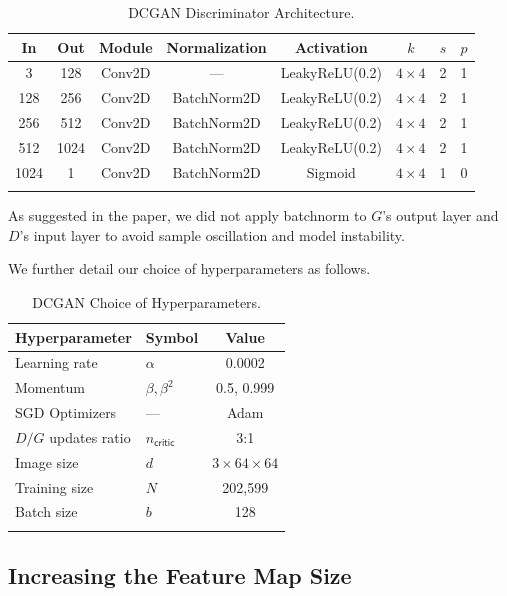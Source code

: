 \documentclass[table]{article}
\begin{document}
\begin{table}[ht]
\centering
\begin{tabular}{c c ccc c c c}
\Xhline{2\arrayrulewidth}
In & Out & Module & Normalization & Activation & $k$ & $s$ & $p$ \\
\hline
3 & 128 &Conv2D & --- & LeakyReLU(0.2) & $4 \times 4$ & 2 & 1 \\
128 & 256 &Conv2D & BatchNorm2D & LeakyReLU(0.2) & $4 \times 4$ & 2 & 1 \\
256 & 512 &Conv2D & BatchNorm2D & LeakyReLU(0.2) & $4 \times 4$ & 2 & 1 \\
512 & 1024 &Conv2D & BatchNorm2D & LeakyReLU(0.2) & $4 \times 4$ & 2 & 1 \\
1024 & 1 & Conv2D & BatchNorm2D & Sigmoid & $4 \times 4$ & 1 & 0 \\
\Xhline{2\arrayrulewidth}
\end{tabular}
\caption{DCGAN Discriminator Architecture.}
\end{table}

As suggested in the paper, we did not apply batchnorm to $G$'s output layer and $D$'s input layer to avoid sample oscillation and model instability.

We further detail our choice of hyperparameters as follows.


\begin{table}[ht]
\centering
\begin{tabular}{l C{1.5cm} c}
\Xhline{2\arrayrulewidth}
Hyperparameter & Symbol & Value \\
\hline
Learning rate & $\alpha$ & 0.0002 \\
Momentum & $\beta, \beta^2$ & 0.5, 0.999\\
SGD Optimizers & --- & Adam \\
$D/G$ updates ratio & $n_{\textsf{critic}}$ & 3:1 \\
\hline
Image size & $d$ & $3 \times 64 \times 64$ \\
Training size & $N$ & 202,599\\
Batch size & $b$ & 128 \\
\Xhline{2\arrayrulewidth}
\end{tabular}
\caption{DCGAN Choice of Hyperparameters.}
\end{table}

\subsection{Increasing the Feature Map Size}
\end{document}
